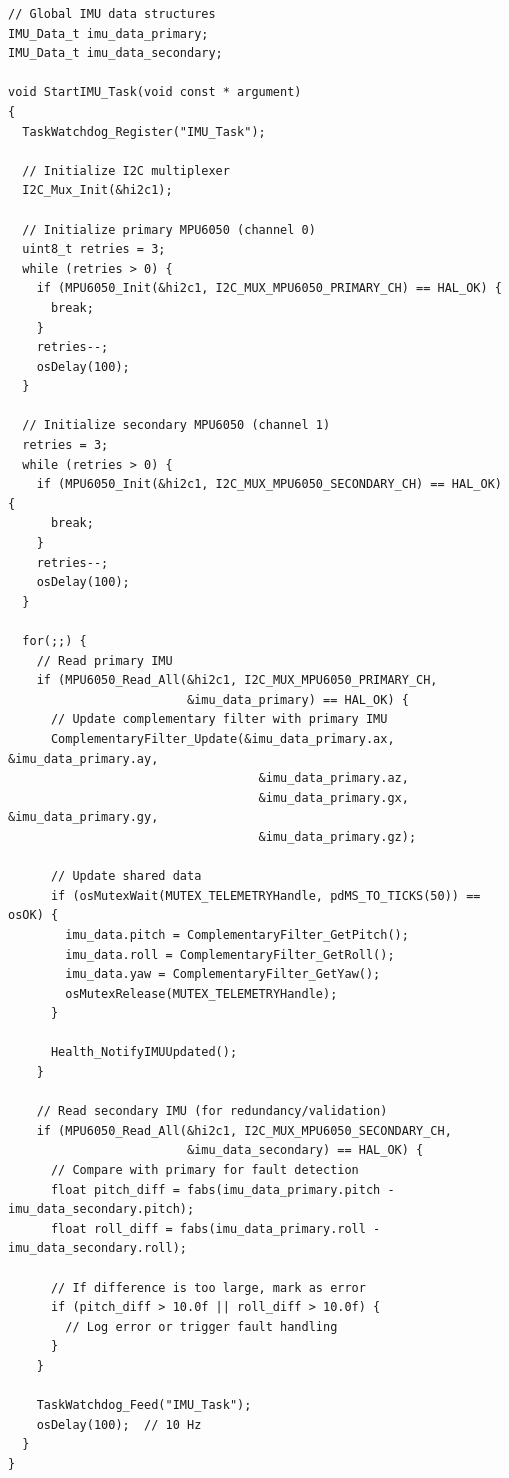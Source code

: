 \documentclass[11pt,a4paper]{article}
\begin{document}
\begin{lstlisting}[caption=Dual IMU Task, label=lst:dualimutask]
// Global IMU data structures
IMU_Data_t imu_data_primary;
IMU_Data_t imu_data_secondary;

void StartIMU_Task(void const * argument)
{
  TaskWatchdog_Register("IMU_Task");
  
  // Initialize I2C multiplexer
  I2C_Mux_Init(&hi2c1);
  
  // Initialize primary MPU6050 (channel 0)
  uint8_t retries = 3;
  while (retries > 0) {
    if (MPU6050_Init(&hi2c1, I2C_MUX_MPU6050_PRIMARY_CH) == HAL_OK) {
      break;
    }
    retries--;
    osDelay(100);
  }
  
  // Initialize secondary MPU6050 (channel 1)
  retries = 3;
  while (retries > 0) {
    if (MPU6050_Init(&hi2c1, I2C_MUX_MPU6050_SECONDARY_CH) == HAL_OK) {
      break;
    }
    retries--;
    osDelay(100);
  }
  
  for(;;) {
    // Read primary IMU
    if (MPU6050_Read_All(&hi2c1, I2C_MUX_MPU6050_PRIMARY_CH, 
                         &imu_data_primary) == HAL_OK) {
      // Update complementary filter with primary IMU
      ComplementaryFilter_Update(&imu_data_primary.ax, &imu_data_primary.ay, 
                                   &imu_data_primary.az,
                                   &imu_data_primary.gx, &imu_data_primary.gy, 
                                   &imu_data_primary.gz);
      
      // Update shared data
      if (osMutexWait(MUTEX_TELEMETRYHandle, pdMS_TO_TICKS(50)) == osOK) {
        imu_data.pitch = ComplementaryFilter_GetPitch();
        imu_data.roll = ComplementaryFilter_GetRoll();
        imu_data.yaw = ComplementaryFilter_GetYaw();
        osMutexRelease(MUTEX_TELEMETRYHandle);
      }
      
      Health_NotifyIMUUpdated();
    }
    
    // Read secondary IMU (for redundancy/validation)
    if (MPU6050_Read_All(&hi2c1, I2C_MUX_MPU6050_SECONDARY_CH, 
                         &imu_data_secondary) == HAL_OK) {
      // Compare with primary for fault detection
      float pitch_diff = fabs(imu_data_primary.pitch - imu_data_secondary.pitch);
      float roll_diff = fabs(imu_data_primary.roll - imu_data_secondary.roll);
      
      // If difference is too large, mark as error
      if (pitch_diff > 10.0f || roll_diff > 10.0f) {
        // Log error or trigger fault handling
      }
    }
    
    TaskWatchdog_Feed("IMU_Task");
    osDelay(100);  // 10 Hz
  }
}
\end{lstlisting}
\end{document}
